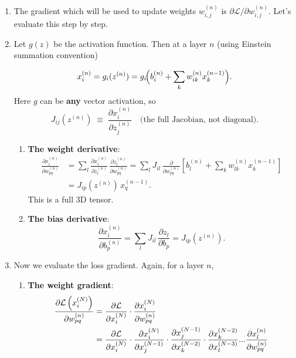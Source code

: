 \documentclass{article}
\begin{document}
    \begin{enumerate}
    \item The gradient which will be used to update weights  $w_{i,j}^{(n)}$ is $\partial\mathcal{L}/\partial w_{i,j}^{(n)}$. Let's evaluate this step by step.
    \item Let $g(z)$ be the activation function. Then at a layer $n$ (using Einstein summation convention)

    \[
      x_i^{(n)} = g_i(z^{(n)}) 
      = g_i\!\Bigl(b_i^{(n)} + \sum_k w_{ik}^{(n)}x_k^{(n-1)}\Bigr).
    \]
    Here \(g\) can be \textbf{any} vector activation, so
    \[
      J_{ij}(z^{(n)}) \;\equiv\;\frac{\partial x_i^{(n)}}{\partial z_j^{(n)}}
      \quad\text{(the full Jacobian, not diagonal).}
    \]
    
    \begin{enumerate}
        
        \item \textbf{The weight derivative}:
        \begin{align*}
        \frac{\partial x_i^{(n)}}{\partial w_{pq}^{(n)}}
        &= \sum_{l}
          \frac{\partial x_i^{(n)}}{\partial z_l^{(n)}}
          \,\frac{\partial z_l^{(n)}}{\partial w_{pq}^{(n)}} = 
          \sum_{l}
          J_{il}
          \,\frac{\partial }{\partial w_{pq}^{(n)}}\left[b_l^{(n)} + \sum_k w_{lk}^{(n)}x_k^{(n-1)}\right]\\
        &= J_{i p}(z^{(n)})\,x_q^{(n-1)}.
      \end{align*}
       This is a full 3D tensor.
      
        \item \textbf{The bias derivative}:
        \[
        \frac{\partial x_i^{(n)}}{\partial b_p^{(n)}}
        = \sum_{l} J_{il}\,\frac{\partial z_l}{\partial b_p}
        = J_{i p}(z^{(n)}).
      \]
        
    \end{enumerate}

    \item Now we evaluate the loss gradient. Again, for a layer $n$,

    \begin{enumerate}
        \item \textbf{The weight gradient}:
        \begin{align*}
            \pdv{\mathcal{L}\left(x_i^{(N)}\right)}{w^{(n)}_{pq}} &= \pdv{\mathcal{L}}{x_i^{(N)}}\cdot \pdv{x_i^{(N)}}{w_{pq}^{(n)}}\\
            &= \pdv{\mathcal{L}}{x_i^{(N)}}\cdot \pdv{x_i^{(N)}}{x_j^{(N-1)}}\cdot \pdv{x_j^{(N-1)}}{x_k^{(N-2)}}\cdot \pdv{x_k^{(N-2)}}{x_l^{(N-3)}}...\pdv{x_l^{(n)}}{w_{pq}^{(n)}}
        \end{align*}


\end{enumerate}
\end{enumerate}
\end{document}
